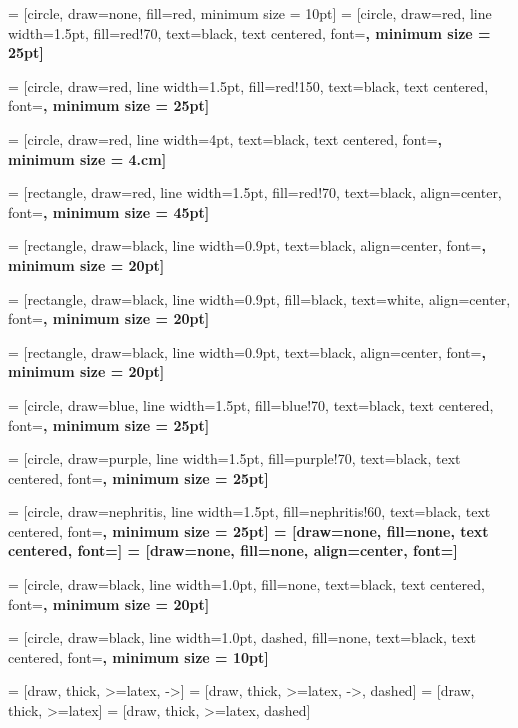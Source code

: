 
 = [circle, draw=none, fill=red, minimum size = 10pt]
 = [circle, draw=red, line width=1.5pt, fill=red!70, text=black, text centered, font=\bf \normalsize, minimum size = 25pt]

 = [circle, draw=red, line width=1.5pt, fill=red!150, text=black, text centered, font=\bf \normalsize, minimum size = 25pt]


 = [circle, draw=red, line width=4pt, text=black, text centered, font=\bf \normalsize, minimum size = 4.cm]

 = [rectangle, draw=red, line width=1.5pt, fill=red!70, text=black, align=center, font=\bf \normalsize, minimum size = 45pt]

 = [rectangle, draw=black, line width=0.9pt, text=black, align=center, font=\bf \normalsize, minimum size = 20pt]

 = [rectangle, draw=black, line width=0.9pt, fill=black, text=white, align=center, font=\bf \normalsize, minimum size = 20pt]

 = [rectangle, draw=black, line width=0.9pt, text=black, align=center, font=\bf \normalsize, minimum size = 20pt]

 = [circle, draw=blue, line width=1.5pt, fill=blue!70, text=black, text centered, font=\bf \normalsize, minimum size = 25pt]

 = [circle, draw=purple, line width=1.5pt, fill=purple!70, text=black, text centered, font=\bf \normalsize, minimum size = 25pt]


 = [circle, draw=nephritis, line width=1.5pt, fill=nephritis!60, text=black, text centered, font=\bf \normalsize, minimum size = 25pt]
 = [draw=none, fill=none, text centered, font=\bf \normalsize]
 = [draw=none, fill=none, align=center, font=\bf \normalsize]

 = [circle, draw=black, line width=1.0pt, fill=none, text=black, text centered, font=\bf \normalsize, minimum size = 20pt]

 = [circle, draw=black, line width=1.0pt, dashed, fill=none, text=black, text centered, font=\bf \normalsize, minimum size = 10pt]


  = [draw, thick, >=latex, ->]
  = [draw, thick, >=latex, ->, dashed]
  = [draw, thick, >=latex]
  = [draw, thick, >=latex, dashed]

